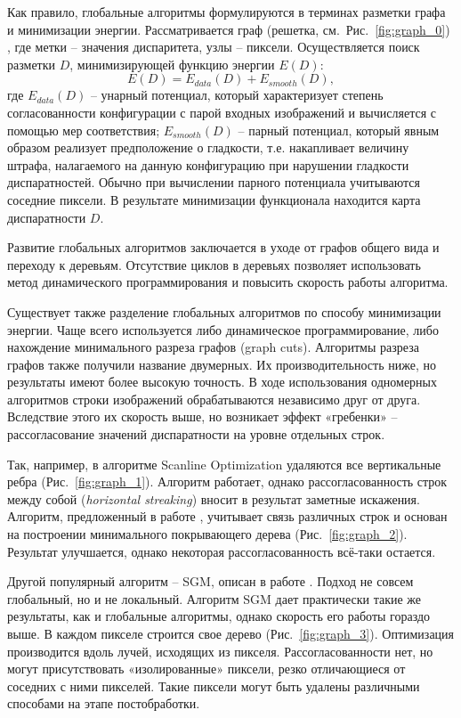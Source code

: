 \documentclass[oneside,final,12pt]{scrartcl}
\begin{document}
			Как правило, глобальные алгоритмы формулируются в терминах разметки графа и минимизации энергии. Рассматривается граф (решетка, см.~Рис.~\ref{fig:graph_0}) , где метки – значения диспаритета, узлы – пиксели. Осуществляется поиск разметки \(D\), минимизирующей функцию энергии	\(E(D)\):
			\begin{equation}
			E\left(D\right) = E_{data}\left(D\right)+E_{smooth}\left(D\right),
			\end{equation}
			где \(E_{data}\left(D\right)\) – унарный потенциал, который характеризует степень согласованности конфигурации с парой входных изображений и вычисляется с помощью мер соответствия; \(E_{smooth}\left(D\right)\) – парный потенциал, который явным образом реализует предположение о гладкости, т.е. накапливает величину штрафа, налагаемого на данную конфигурацию при нарушении гладкости диспаратностей. Обычно при вычислении парного потенциала учитываются соседние пиксели. В результате минимизации функционала находится карта диспаратности \(D\).

			Развитие глобальных алгоритмов заключается в уходе от графов	общего вида и переходу к деревьям. Отсутствие циклов в деревьях позволяет использовать метод	динамического программирования и повысить скорость работы алгоритма.

			Существует также разделение глобальных алгоритмов по способу минимизации
			энергии. Чаще всего используется либо динамическое программирование, либо нахождение минимального разреза графов (graph cuts). Алгоритмы разреза графов также получили название двумерных. Их производительность ниже, но результаты имеют более высокую точность. В ходе использования одномерных алгоритмов строки изображений обрабатываются независимо друг от друга. Вследствие этого их	скорость выше, но возникает эффект «гребенки» – рассогласование значений диспаратности на уровне отдельных строк.

			Так, например, в алгоритме Scanline Optimization \cite{Jung2006} удаляются все вертикальные ребра (Рис.~\ref{fig:graph_1}). Алгоритм работает, однако рассогласованность строк между собой (\textit{horizontal streaking}) вносит в результат заметные искажения. Алгоритм, предложенный в работе \cite{Veksler2005}, учитывает связь различных строк и основан на построении минимального покрывающего дерева (Рис.~\ref{fig:graph_2}). Результат улучшается, однако некоторая рассогласованность всё-таки остается.

			Другой популярный алгоритм -- SGM, описан в работе \cite{Hirschmuller2008}. Подход не совсем глобальный, но и не локальный. Алгоритм SGM дает практически такие же результаты, как и глобальные алгоритмы, однако скорость его работы гораздо выше. В каждом пикселе строится свое дерево (Рис.~\ref{fig:graph_3}). Оптимизация производится вдоль лучей, исходящих из пикселя. Рассогласованности нет, но могут присутствовать «изолированные» пиксели, резко отличающиеся от соседних с ними пикселей. Такие пиксели могут быть удалены различными способами на этапе постобработки.
\end{document}
